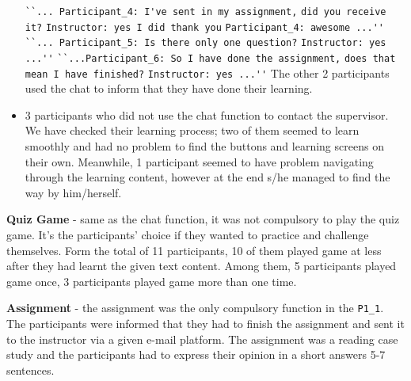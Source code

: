 \begin{itemize}
\verb|``... Participant_4: I've sent in my assignment,|\hfill
\newline\verb|did you receive it?|\hfill
      	      \newline \verb|Instructor: yes I did thank you|\hfill 
      	      \newline \verb|Participant_4: awesome ...''|\hfill
\newline \newline \verb|``... Participant_5: Is there only one question?|\hfill
      	      \newline \verb|Instructor: yes ...''|\hfill 
\newline \newline \verb|``...Participant_6:	So I have done the assignment,|\hfill
\newline\verb|does that mean I have finished?|\hfill 
      	  \newline \verb|Instructor: yes ...''|
\newline 
\newline \noindent The other 2 participants used the chat to inform that they have done their learning. 

\item 3 participants who did not use the chat function to contact the supervisor. We have checked their learning process; two of them seemed to learn smoothly and had no problem to find the buttons and learning screens on their own. Meanwhile, 1 participant seemed to have problem navigating through the learning content, however at the end s/he managed to find the way by him/herself. 
\end{itemize}


\noindent\textbf{Quiz Game} - same as the chat function, it was not compulsory to play the quiz game. It's the participants' choice if they wanted to practice and challenge themselves. 
Form the total of 11 participants, 10 of them played game at less after they had learnt the given text content. Among them, 5 participants played game once, 3 participants played game more than one time. 



\noindent \textbf{Assignment} - the assignment was the only compulsory function in the \verb|P1_1|. The participants were informed that they had to finish the assignment and sent it to the instructor via a given e-mail platform. The assignment was a reading case study and the participants had to express their opinion in a short answers 5-7 sentences. 


